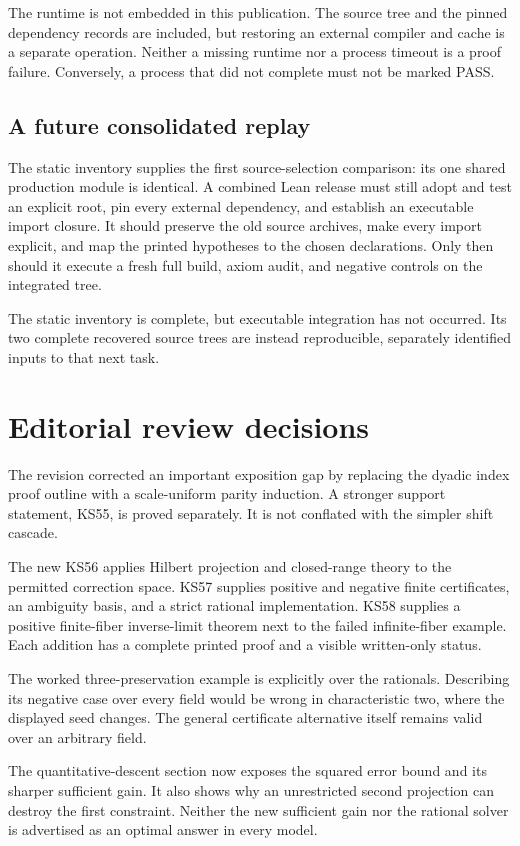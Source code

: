 \documentclass[11pt]{article}
\begin{document}
The runtime is not embedded in this publication. The source tree and the pinned dependency records are included, but restoring an external compiler and cache is a separate operation. Neither a missing runtime nor a process timeout is a proof failure. Conversely, a process that did not complete must not be marked PASS.

\subsection{A future consolidated replay}
The static inventory supplies the first source-selection comparison: its one shared production module is identical. A combined Lean release must still adopt and test an explicit root, pin every external dependency, and establish an executable import closure. It should preserve the old source archives, make every import explicit, and map the printed hypotheses to the chosen declarations. Only then should it execute a fresh full build, axiom audit, and negative controls on the integrated tree.

The static inventory is complete, but executable integration has not occurred. Its two complete recovered source trees are instead reproducible, separately identified inputs to that next task.

\section{Editorial review decisions}
The revision corrected an important exposition gap by replacing the dyadic index proof outline with a scale-uniform parity induction. A stronger support statement, KS55, is proved separately. It is not conflated with the simpler shift cascade.

The new KS56 applies Hilbert projection and closed-range theory to the permitted correction space. KS57 supplies positive and negative finite certificates, an ambiguity basis, and a strict rational implementation. KS58 supplies a positive finite-fiber inverse-limit theorem next to the failed infinite-fiber example. Each addition has a complete printed proof and a visible written-only status.

The worked three-preservation example is explicitly over the rationals. Describing its negative case over every field would be wrong in characteristic two, where the displayed seed changes. The general certificate alternative itself remains valid over an arbitrary field.

The quantitative-descent section now exposes the squared error bound and its sharper sufficient gain. It also shows why an unrestricted second projection can destroy the first constraint. Neither the new sufficient gain nor the rational solver is advertised as an optimal answer in every model.
\end{document}
